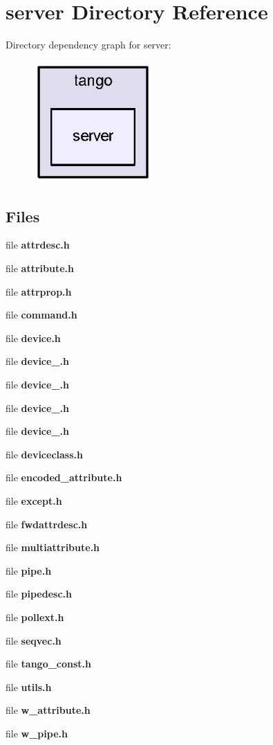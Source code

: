 \section{server Directory Reference}
\label{dir_79113505b788390cea668fc667f11f7d}
Directory dependency graph for server\-:
\nopagebreak
\begin{figure}[H]
\begin{center}
\leavevmode
\includegraphics[width=130pt]{dir_79113505b788390cea668fc667f11f7d_dep}
\end{center}
\end{figure}
\subsection*{Files}
\begin{DoxyCompactItemize}
\item 
file {\bf attrdesc.\-h}
\item 
file {\bf attribute.\-h}
\item 
file {\bf attrprop.\-h}
\item 
file {\bf command.\-h}
\item 
file {\bf device.\-h}
\item 
file {\bf device\-\_.\-h}
\item 
file {\bf device\-\_.\-h}
\item 
file {\bf device\-\_.\-h}
\item 
file {\bf device\-\_.\-h}
\item 
file {\bf deviceclass.\-h}
\item 
file {\bf encoded\-\_\-attribute.\-h}
\item 
file {\bf except.\-h}
\item 
file {\bf fwdattrdesc.\-h}
\item 
file {\bf multiattribute.\-h}
\item 
file {\bf pipe.\-h}
\item 
file {\bf pipedesc.\-h}
\item 
file {\bf pollext.\-h}
\item 
file {\bf seqvec.\-h}
\item 
file {\bf tango\-\_\-const.\-h}
\item 
file {\bf utils.\-h}
\item 
file {\bf w\-\_\-attribute.\-h}
\item 
file {\bf w\-\_\-pipe.\-h}
\end{DoxyCompactItemize}
